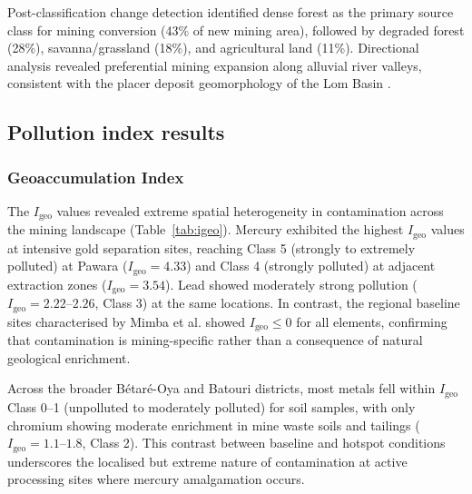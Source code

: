 \documentclass[preprint,12pt,authoryear]{elsarticle}
\begin{document}
Post-classification change detection identified dense forest as the primary source class for mining conversion (43\% of new mining area), followed by degraded forest (28\%), savanna/grassland (18\%), and agricultural land (11\%). Directional analysis revealed preferential mining expansion along alluvial river valleys, consistent with the placer deposit geomorphology of the Lom Basin \citep{Mimba2018}.


\subsection{Pollution index results}

\subsubsection{Geoaccumulation Index}

The $I_\text{geo}$ values revealed extreme spatial heterogeneity in contamination across the mining landscape (Table~\ref{tab:igeo}). Mercury exhibited the highest $I_\text{geo}$ values at intensive gold separation sites, reaching Class 5 (strongly to extremely polluted) at Pawara ($I_\text{geo} = 4.33$) and Class 4 (strongly polluted) at adjacent extraction zones ($I_\text{geo} = 3.54$). Lead showed moderately strong pollution ($I_\text{geo} = 2.22$--$2.26$, Class 3) at the same locations. In contrast, the regional baseline sites characterised by Mimba et al. \citep{Mimba2018} showed $I_\text{geo} \leq 0$ for all elements, confirming that contamination is mining-specific rather than a consequence of natural geological enrichment.

Across the broader B\'{e}tar\'{e}-Oya and Batouri districts, most metals fell within $I_\text{geo}$ Class 0--1 (unpolluted to moderately polluted) for soil samples, with only chromium showing moderate enrichment in mine waste soils and tailings ($I_\text{geo} = 1.1$--$1.8$, Class 2). This contrast between baseline and hotspot conditions underscores the localised but extreme nature of contamination at active processing sites where mercury amalgamation occurs.
\end{document}
